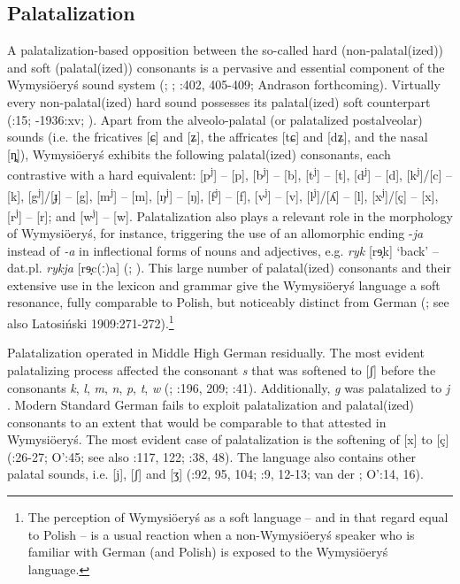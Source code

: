 \documentclass[output=paper]{langscibook}
\begin{document}
\subsection{Palatalization}\label{sec:wymsorys:3.9}

A palatalization-based opposition between the so-called hard (non-palatal(ized)) and soft (palatal(ized)) consonants is a pervasive and essential component of the Wymysiöeryś sound system (\citealt{Kleczkowski1920}; \citealt{Anders1933}; \citealt{Wicherkiewicz2003}:402, 405-409; Andrason forthcoming). Virtually every non-palatal(ized) hard sound possesses its palatal(ized) soft counterpart (\citealt{Kleczkowski1920}:15; \citealt{Mojmir1930}-1936:xv; \citealt{AndrasonKról2016}). Apart from the alveolo-palatal (or palatalized postalveolar) sounds (i.e. the fricatives [ɕ] and [ʑ], the affricates [tɕ] and [dʑ], and the nasal [ȵ]), Wymysiöeryś exhibits the following palatal(ized) consonants, each contrastive with a hard equivalent: [p\textsuperscript{j}] – [p], [b\textsuperscript{j}] – [b], [t\textsuperscript{j}] – [t], [d\textsuperscript{j}] – [d], [k\textsuperscript{j}]/[c] – [k], [g\textsuperscript{j}]/[ɟ] – [g], [m\textsuperscript{j}] – [m], [ŋ\textsuperscript{j}] – [ŋ], [f\textsuperscript{j}] – [f], [v\textsuperscript{j}] – [v], [l\textsuperscript{j}]/[ʎ] – [l], [x\textsuperscript{j}]/[ç] – [x], [r\textsuperscript{j}] – [r]; and [w\textsuperscript{j}] – [w]. Palatalization also plays a relevant role in the morphology of Wymysiöeryś, for instance, triggering the use of an allomorphic ending -\textit{ja} instead of \textit{{}-a} in inflectional forms of nouns and adjectives, e.g. \textit{ryk} [rɘ̟k] ‘back’ – dat.pl. \textit{rykja} [rɘ̟c(ː)a] (\citealt{Andrason2014b,20152014b}; \citealt{AndrasonKról2016}). This large number of palatal(ized) consonants and their extensive use in the lexicon and grammar give the Wymysiöeryś language a soft resonance, fully comparable to Polish, but noticeably distinct from German (\citealt{Kleczkowski1920}; see also Latosiński 1909:271-272).\footnote{The perception of Wymysiöeryś as a soft language – and in that regard equal to Polish – is a usual reaction when a non-Wymysiöeryś speaker who is familiar with German (and Polish) is exposed to the Wymysiöeryś language.} 

Palatalization operated in Middle High German residually. The most evident palatalizing process affected the consonant \textit{s} that was softened to [ʃ] before the consonants \textit{k}, \textit{l}, \textit{m}, \textit{n}, \textit{p}, \textit{t}, \textit{w} (\citealt{Paul2007}; \citealt{Fagan2009}:196, 209; \citealt{Hennings2012}:41). Additionally, \textit{g} was palatalized to \textit{j} \citep[37]{Paul2007}. Modern Standard German fails to exploit palatalization and palatal(ized) consonants to an extent that would be comparable to that attested in Wymysiöeryś. The most evident case of palatalization is the softening of [x] to [ç] (\citealt{Fagan2009}:26-27; O’\citealt{BrienFagan2016}:45; see also \citealt{Russ1994}:117, 122; \citealt{Fox2005}:38, 48). The language also contains other palatal sounds, i.e. [j], [ʃ] and [ʒ] (\citealt{JohnsonBraber2008}:92, 95, 104; \citealt{Fagan2009}:9, 12-13; van der \citealt{Hoek2010}; O’\citealt{BrienFagan2016}:14, 16).
\end{document}
